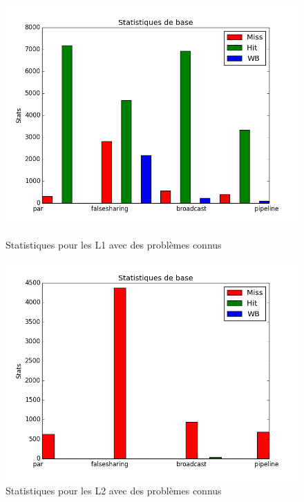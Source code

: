 \begin{figure}[H]
   \begin{minipage}[l]{.46\textwidth}
     \includegraphics[scale=0.35]{images/stats_L1.png}
     \caption{\label{img:inclusifs} Statistiques pour les L1 avec des problèmes connus}
   \end{minipage} \hfill
   \begin{minipage}[r]{.46\textwidth}
     \includegraphics[scale=0.35]{images/stats_L2.png}
     \caption{\label{img:inclusifs} Statistiques pour les L2 avec des problèmes connus}
   \end{minipage}
\end{figure}

